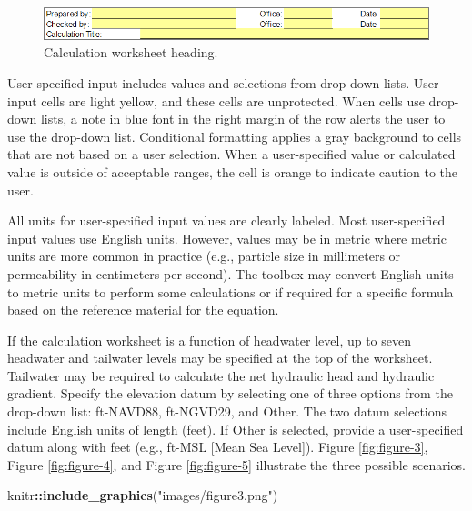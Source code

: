 \documentclass[
]{book}
\newenvironment{Shaded}{\begin{snugshade}}{\end{snugshade}}
\newcommand{\FunctionTok}[1]{\textcolor[rgb]{0.13,0.29,0.53}{\textbf{#1}}}
\newcommand{\NormalTok}[1]{#1}
\newcommand{\SpecialCharTok}[1]{\textcolor[rgb]{0.81,0.36,0.00}{\textbf{#1}}}
\newcommand{\StringTok}[1]{\textcolor[rgb]{0.31,0.60,0.02}{#1}}
\begin{document}
\begin{figure}

{\centering \includegraphics{images/figure2} 

}

\caption{Calculation worksheet heading.}\label{fig:figure-2}
\end{figure}

User-specified input includes values and selections from drop-down lists. User input cells are light yellow, and these cells are unprotected. When cells use drop-down lists, a note in blue font in the right margin of the row alerts the user to use the drop-down list. Conditional formatting applies a gray background to cells that are not based on a user selection. When a user-specified value or calculated value is outside of acceptable ranges, the cell is orange to indicate caution to the user.

All units for user-specified input values are clearly labeled. Most user-specified input values use English units. However, values may be in metric where metric units are more common in practice (e.g., particle size in millimeters or permeability in centimeters per second). The toolbox may convert English units to metric units to perform some calculations or if required for a specific formula based on the reference material for the equation.

If the calculation worksheet is a function of headwater level, up to seven headwater and tailwater levels may be specified at the top of the worksheet. Tailwater may be required to calculate the net hydraulic head and hydraulic gradient. Specify the elevation datum by selecting one of three options from the drop-down list: ft-NAVD88, ft-NGVD29, and Other. The two datum selections include English units of length (feet). If Other is selected, provide a user-specified datum along with feet (e.g., ft-MSL {[}Mean Sea Level{]}). Figure \ref{fig:figure-3}, Figure \ref{fig:figure-4}, and Figure \ref{fig:figure-5} illustrate the three possible scenarios.

\begin{Shaded}
\begin{Highlighting}[]
\NormalTok{knitr}\SpecialCharTok{::}\FunctionTok{include\_graphics}\NormalTok{(}\StringTok{"images/figure3.png"}\NormalTok{)}
\end{Highlighting}
\end{Shaded}
\end{document}

